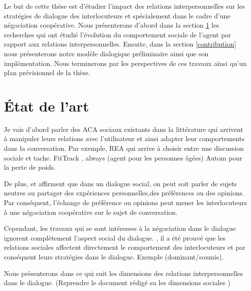 \documentclass[a4paper,french]{article}
\begin{document}
\par Le but de cette thèse est d'étudier l'impact des relations interpersonnelles sur les stratégies de dialogue des interlocuteurs et spécialement dans le cadre d'une négociation coopérative. Nous présenterons d'abord dans la section \ref{RW} les recherches qui ont étudié l'évolution du comportement sociale de l'agent par rapport aux relations interpersonnelles. Ensuite, dans la section \ref{contribution} nous présenterons notre modèle dialogique préliminaire ainsi que son implémentation. Nous terminerons par les perspectives de ces travaux ainsi qu'un plan prévisionnel de la thèse.

\section{État de l'art}
\label{RW}
Je vais d'abord parler des ACA sociaux existants dans la littérature qui arrivent à manipuler leurs relations avec l'utilisateur et ainsi adapter leur comportements dans la conversation. Par exemple, REA qui arrive à choisir entre une discussion sociale et tache.
FitTrack \cite{bickmore2005s}, always \cite{sidner2013always}(agent pour les personnes âgées)
Autom pour la perte de poids.

De plus, \cite{bickmore2005social}  et \cite{laver1981linguistic} affirment que dans un dialogue social, on peut soit parler de sujets neutres ou partager des expériences personnelles,des préférences ou des opinions. Par conséquent, l'échange de préférence ou opinions peut mener les interlocuteurs à une négociation coopérative sur le sujet de conversation.


Cependant, les travaux qui se sont intéresses à la négociation \cite{amgoud2000arguments,mcburney2004denotational,daskalopulu1998handling} dans le dialogue ignorent complètement l'aspect social du dialogue. , il a été prouvé que les relations sociales affectent directement le comportement des interlocuteurs \cite{bickmore2000weather, bickmore2005establishing, moon1998intimate, nass2000does} et par conséquent leurs stratégies dans le dialogue. 
Exemple (dominant/soumis). 

Nous présenterons dans ce qui suit les dimensions des relations interpersonnelles dans le dialogue. 
(Reprendre le document rédigé su les dimensions sociales \cite {svennevig2000getting, haslam1994mental})
\end{document}
